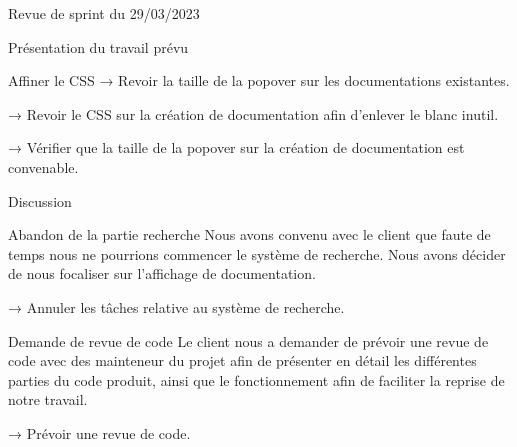 \documentclass[]{article}
\begin{document}
{\begin{section}{Revue de sprint du 29/03/2023}
\begin{subsection}{Présentation du travail prévu}
\begin{subsubsection}{Affiner le CSS}
         → Revoir la taille de la popover sur les documentations existantes.

         → Revoir le CSS sur la création de documentation afin d’enlever le blanc inutil.

         → Vérifier que la taille de la popover sur la création de documentation est convenable.
     \end{subsubsection}
 \end{subsection}

 \begin{subsection}{Discussion}
     \begin{subsubsection}{Abandon de la partie recherche}
         Nous avons convenu avec le client que faute de temps nous ne pourrions commencer le système de recherche. Nous avons décider de nous focaliser sur l’affichage de documentation.

         → Annuler les tâches relative au système de recherche.
     \end{subsubsection}

     \begin{subsubsection}{Demande de revue de code}
         Le client nous a demander de prévoir une revue de code avec des mainteneur du projet afin de présenter en détail les différentes parties du code produit, ainsi que le fonctionnement afin de faciliter la reprise de notre travail.

         → Prévoir une revue de code.
     \end{subsubsection}
 \end{subsection}
\end{section}
}
\end{document}
